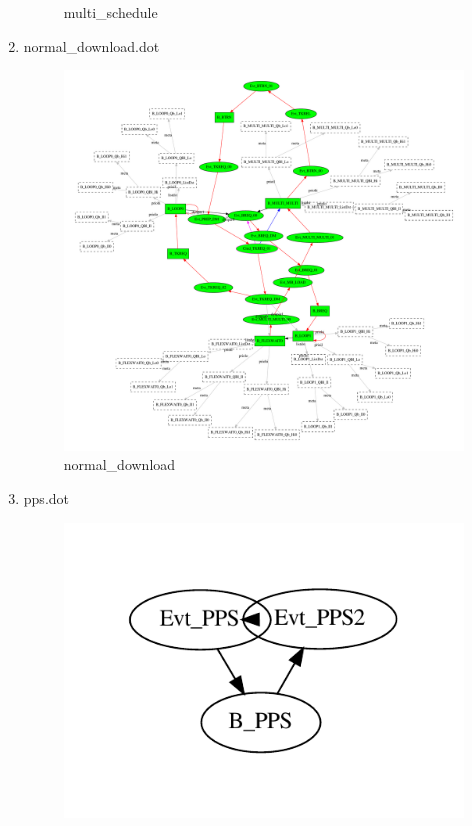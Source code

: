 \documentclass[12pt,a4paper]{report}
\begin{document}
\begin{enumerate}
\begin{figure}
        \caption{multi\_schedule}
        \label{fig:multi_schedule}
    \end{figure}
\item normal\_download.dot
    \begin{figure}
        \centering 
        \includegraphics*[width=1.0\textwidth,keepaspectratio]{TestPattern/normal_download.pdf}
        \caption{normal\_download}
        \label{fig:normal_download}
    \end{figure}
\item pps.dot
    \begin{figure}
        \centering 
        \includegraphics*[width=1.0\textwidth,keepaspectratio]{TestPattern/pps.pdf}

\end{figure}
\end{enumerate}
\end{document}
